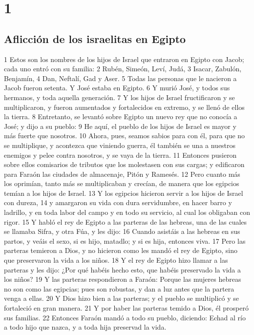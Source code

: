 

\chapter{1}

\section*{Aflicción de los israelitas en Egipto}

1 Estos son los nombres de los hijos de Israel que entraron en Egipto con Jacob; cada uno entró con su familia:
2 Rubén, Simeón, Leví, Judá,
3 Isacar, Zabulón, Benjamín,
4 Dan, Neftalí, Gad y Aser.
5 Todas las personas que le nacieron a Jacob fueron setenta. Y José estaba en Egipto.
6 Y murió José, y todos sus hermanos, y toda aquella generación.
7 Y los hijos de Israel fructificaron y se multiplicaron, y fueron aumentados y fortalecidos en extremo, y se llenó de ellos la tierra.
8 Entretanto, se levantó sobre Egipto un nuevo rey que no conocía a José; y dijo a su pueblo:
9 He aquí, el pueblo de los hijos de Israel es mayor y más fuerte que nosotros.
10 Ahora, pues, seamos sabios para con él, para que no se multiplique, y acontezca que viniendo guerra, él también se una a nuestros enemigos y pelee contra nosotros, y se vaya de la tierra.
11 Entonces pusieron sobre ellos comisarios de tributos que los molestasen con sus cargas; y edificaron para Faraón las ciudades de almacenaje, Pitón y Ramesés.
12 Pero cuanto más los oprimían, tanto más se multiplicaban y crecían, de manera que los egipcios temían a los hijos de Israel.
13 Y los egipcios hicieron servir a los hijos de Israel con dureza,
14 y amargaron su vida con dura servidumbre, en hacer barro y ladrillo, y en toda labor del campo y en todo su servicio, al cual los obligaban con rigor.
15 Y habló el rey de Egipto a las parteras de las hebreas, una de las cuales se llamaba Sifra, y otra Fúa, y les dijo:
16 Cuando asistáis a las hebreas en sus partos, y veáis el sexo, si es hijo, matadlo; y si es hija, entonces viva.
17 Pero las parteras temieron a Dios, y no hicieron como les mandó el rey de Egipto, sino que preservaron la vida a los niños.
18 Y el rey de Egipto hizo llamar a las parteras y les dijo: ¿Por qué habéis hecho esto, que habéis preservado la vida a los niños?
19 Y las parteras respondieron a Faraón: Porque las mujeres hebreas no son como las egipcias; pues son robustas, y dan a luz antes que la partera venga a ellas.
20 Y Dios hizo bien a las parteras; y el pueblo se multiplicó y se fortaleció en gran manera.
21 Y por haber las parteras temido a Dios, él prosperó sus familias.
22 Entonces Faraón mandó a todo su pueblo, diciendo: Echad al río a todo hijo que nazca, y a toda hija preservad la vida.

